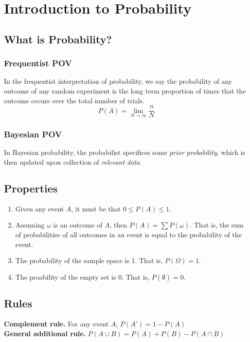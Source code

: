 
    \section{Introduction to Probability}  %
        \subsection{What is Probability?}  %
            \subsubsection{Frequentist POV}  %
                In the frequentist interpretation of probability, we say the probability of any outcome of any random experiment is the long term proportion of times that the outcome occurs over the total number of trials.
                \begin{equation}P(A)=\lim_{N\to\infty}\frac{n}{N}\end{equation}

            \subsubsection{Bayesian POV}  %
                In Bayesian probability, the probabilist specifices some \emph{prior probability}, which is then updated upon collection of \emph{relevant data}.

        \subsection{Properties}  %
            \begin{enumerate}
                \item Given any event $A$, it must be that $0\leq P(A) \leq 1$.
                \item Assuming $\omega$ is an outcome of $A$, then $P(A)=\sum P(\omega)$. That is, the sum of probabilities of all outcomes in an event is equal to the probability of the event.
                \item The probability of the sample space is 1. That is, $P(\Omega)=1$.
                \item The proability of the empty set is 0. That is, $P(\emptyset)=0$.
            \end{enumerate}

        \subsection{Rules}  %
            \textbf{Complement rule. } For any event $A$, $P(A')=1-P(A)$ \\
            \textbf{General additional rule. } $P(A\cup B)= P(A)+P(B)-P(A\cap B)$ \\

